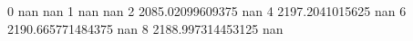 0 nan nan
1 nan nan
2 2085.02099609375 nan
4 2197.2041015625 nan
6 2190.665771484375 nan
8 2188.997314453125 nan
